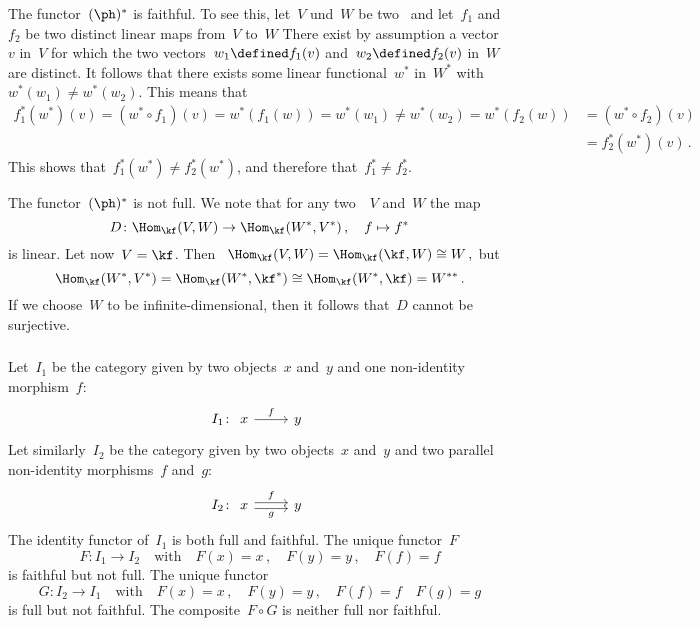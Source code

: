 \begin{description}
		The functor~$(\ph)^*$ is faithful.
		To see this, let~$V$ und~$W$ be two~\vectorspaces{$\kf$} and let~$f_1$ and~$f_2$ be two distinct linear maps from~$V$ to~$W$
		There exist by assumption a vector~$v$ in~$V$ for which the two vectors~$w_1 \defined f_1(v)$ and~$w_2 \defined f_2(v)$ in~$W$ are distinct.
		It follows that there exists some linear functional~$w^*$ in~$W^*$ with~$w^*(w_1) \neq w^*(w_2)$.
		This means that
		\begin{align*}
			f_1^*(w^*)(v)
			=
			(w^* \circ f_1)(v)
			=
			w^*( f_1(w) )
			=
			w^*(w_1)
			\neq
			w^*(w_2)
			=
			w^*( f_2(w) )
			&=
			(w^* \circ f_2)(v)
			\\
			&=
			f_2^*(w^*)(v) \,.
		\end{align*}
		This shows that~$f_1^*(w^*) \neq f_2^*(w^*)$, and therefore that~$f_1^* \neq f_2^*$.
		
		The functor~$(\ph)^*$ is not full.
		We note that for any two~\vectorspaces{$\kf$}~$V$ and~$W$ the map
		\[
			D
			\colon
			\Hom_{\kf}(V, W) \to \Hom_{\kf}(W^*, V^*) \,,
			\quad
			f \mapsto f^*
		\]
		is linear.
		Let now~$V = \kf$.
		Then~%
		$
			\Hom_{\kf}(V, W)
			=
			\Hom_{\kf}(\kf, W)
			\cong
			W \,,
		$
		but
		\[
			\Hom_{\kf}(W^*, V^*)
			=
			\Hom_{\kf}(W^*, \kf^*)
			\cong
			\Hom_{\kf}(W^*, \kf)
			=
			W^{**} \,.
		\]
		If we choose~$W$ to be infinite-dimensional, then it follows that~$D$ cannot be surjective.
\end{description}





\subsubsection{}

Let~$I_1$ be the category given by two objects~$x$ and~$y$ and one non-identity morphism~$f$:
\[
	I_1
	\colon
	\begin{tikzcd}
		x
		\arrow{r}[above]{f}
		&
		y
	\end{tikzcd}
\]
Let similarly~$I_2$ be the category given by two objects~$x$ and~$y$ and two parallel non-identity morphisms~$f$ and~$g$:
\[
	I_2
	\colon
	\begin{tikzcd}
		x
		\arrow[yshift= 0.5ex]{r}[above]{f}
		\arrow[yshift=-0.5ex]{r}[below]{g}
		&
		y
	\end{tikzcd}
\]
The identity functor of~$I_1$ is both full and faithful.
The unique functor~$F$
\[
	F
	\colon
	I_1 \to I_2
	\quad\text{with}\quad
	F(x) = x \,,
	\quad
	F(y) = y \,,
	\quad
	F(f) = f
\]
is faithful but not full.
The unique functor
\[
	G
	\colon
	I_2 \to I_1
	\quad\text{with}\quad
	F(x) = x \,,
	\quad
	F(y) = y \,,
	\quad
	F(f) = f
	\quad
	F(g) = g
\]
is full but not faithful.
The composite~$F \circ G$ is neither full nor faithful.
